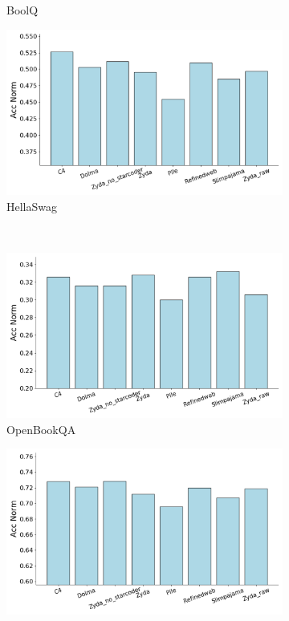 \documentclass{article}
\begin{document}
\begin{figure}[!htb]
\begin{subfigure}{0.45\textwidth}
        \caption{BoolQ}
    \end{subfigure}
    \hfill
    \begin{subfigure}{0.45\textwidth}
        \includegraphics[width=\textwidth]{figures/ablations_per_eval/ablations_evals_Hellaswag.png}
        \caption{HellaSwag}
    \end{subfigure}
    \\
    \begin{subfigure}{0.45\textwidth}
        \includegraphics[width=\textwidth]{figures/ablations_per_eval/ablations_evals_Openbookqa.png}
        \caption{OpenBookQA}
    \end{subfigure}
    \hfill
    \begin{subfigure}{0.45\textwidth}
        \includegraphics[width=\textwidth]{figures/ablations_per_eval/ablations_evals_Piqa.png}

\end{subfigure}
\end{figure}
\end{document}
